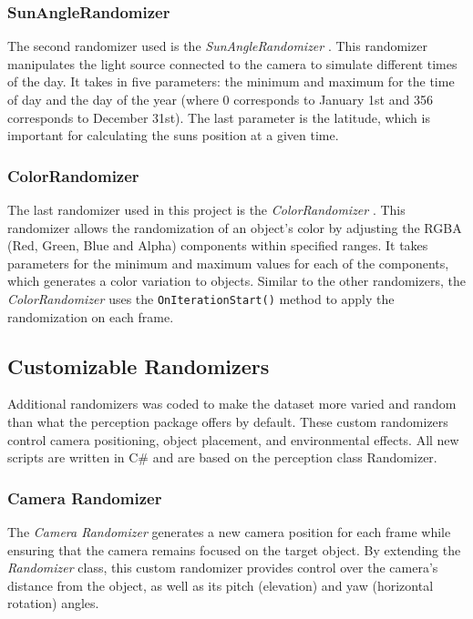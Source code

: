 \subsubsection{SunAngleRandomizer}
The second randomizer used is the \textit{SunAngleRandomizer} \cite{sun_angle_randomizer}. This randomizer manipulates the light source connected to the camera to simulate different times of the day. It takes in five parameters: the minimum and maximum for the time of day and the day of the year (where 0 corresponds to January 1st and 356 corresponds to December 31st). The last parameter is the latitude, which is important for calculating the suns position at a given time.

\subsubsection{ColorRandomizer}
The last randomizer used in this project is the \textit{ColorRandomizer} \cite{color_randomizer}. This randomizer allows the randomization of an object's color by adjusting the RGBA (Red, Green, Blue and Alpha) components within specified ranges. It takes parameters for the minimum and maximum values for each of the components, which generates a color variation to objects. Similar to the other randomizers, the \textit{ColorRandomizer} uses the \texttt{OnIterationStart()} method to apply the randomization on each frame.


\subsection{Customizable Randomizers}
Additional randomizers was coded to make the dataset more varied and random than what the perception package offers by default. These custom randomizers control camera positioning, object placement, and environmental effects. All new scripts are written in C\# and are based on the perception class Randomizer.

\subsubsection{Camera Randomizer}
The \textit{Camera Randomizer} generates a new camera position for each frame while ensuring that the camera remains focused on the target object. By extending the \textit{Randomizer} class, this custom randomizer provides control over the camera's distance from the object, as well as its pitch (elevation) and yaw (horizontal rotation) angles. \\

